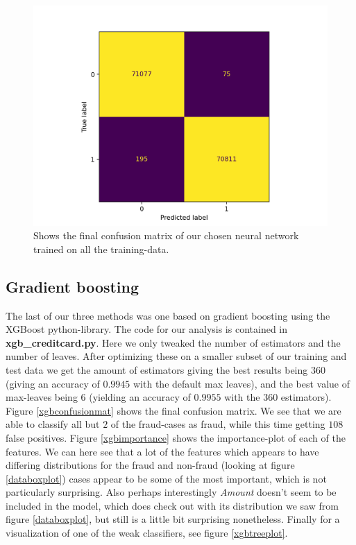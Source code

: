 \documentclass{article}
\begin{document}
\begin{figure}
	\centering
	\includegraphics[scale=0.8]{nn_final_confusion_mat}
	\caption{Shows the final confusion matrix of our chosen neural network
		trained on all the training-data.}
	\label{nnconfusionmat}
\end{figure}


\subsection{Gradient boosting}
The last of our three methods was one based on gradient boosting using the
XGBoost python-library. The code for our analysis is contained in
\textbf{xgb\_creditcard.py}. Here we only tweaked the number of estimators and
the number of leaves. After optimizing these on a smaller subset of our
training and test data we get the amount of estimators giving the best results
being $360$ (giving an accuracy of $0.9945$ with the default max leaves), and
the best value of max-leaves being $6$ (yielding an accuracy of $0.9955$ with
the $360$ estimators). Figure \ref{xgbconfusionmat} shows the final confusion
matrix. We see that we are able to classify all but $2$ of the fraud-cases as
fraud, while this time getting $108$ false positives. Figure \ref{xgbimportance}
shows the importance-plot of each of the features. We can here see that a lot of
the features which appears to have differing distributions for the fraud and
non-fraud (looking at figure \ref{databoxplot}) cases appear to be some of the
most important, which is not particularly surprising. Also perhaps interestingly
\textit{Amount} doesn't seem to be included in the model, which does check out
with its distribution we saw from figure \ref{databoxplot}, but still is a
little bit surprising nonetheless. Finally for a visualization of one of the
weak classifiers, see figure \ref{xgbtreeplot}.
\end{document}
